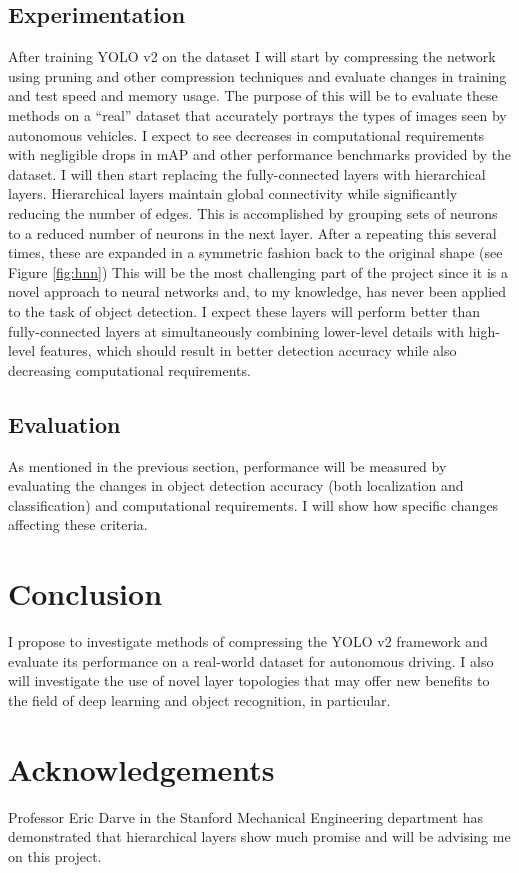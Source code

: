 \documentclass{article}
\begin{document}
	\subsection{Experimentation}
	After training YOLO v2 on the dataset I will start by compressing the network using pruning and other compression techniques and evaluate changes in training and test speed and memory usage. The purpose of this will be to evaluate these methods on a ``real'' dataset that accurately portrays the types of images seen by autonomous vehicles. I expect to see decreases in computational requirements with negligible drops in mAP and other performance benchmarks provided by the dataset. I will then start replacing the fully-connected layers with hierarchical layers. Hierarchical layers maintain global connectivity while significantly reducing the number of edges. This is accomplished by grouping sets of neurons to a reduced number of neurons in the next layer. After a repeating this several times, these are expanded in a symmetric fashion back to the original shape (see Figure \ref{fig:hnn}) This will be the most challenging part of the project since it is a novel approach to neural networks and, to my knowledge, has never been applied to the task of object detection. I expect these layers will perform better than fully-connected layers at simultaneously combining lower-level details with high-level features, which should result in better detection accuracy while also decreasing computational requirements. 
	
	\subsection{Evaluation}
	As mentioned in the previous section, performance will be measured by evaluating the changes in object detection accuracy (both localization and classification) and computational requirements. I will show how specific changes affecting these criteria.
	
	\section{Conclusion}
	I propose to investigate methods of compressing the YOLO v2 framework and evaluate its performance on a real-world dataset for autonomous driving. I also will investigate the use of novel layer topologies that may offer new benefits to the field of deep learning and object recognition, in particular. 
	
	\section*{Acknowledgements}
	Professor Eric Darve in the Stanford Mechanical Engineering department has demonstrated that hierarchical layers show much promise and will be advising me on this project.
	 
	
	\printbibliography
	
\end{document}
